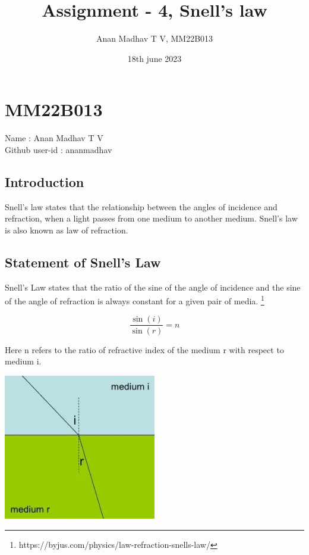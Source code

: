 \documentclass[12pt,a4paper]{article}
\title{Assignment - 4, Snell's law }
\author{Anan Madhav T V, MM22B013}
\date{18th june 2023}
\begin{document}
\maketitle
\section{MM22B013}
Name : Anan Madhav T V\\
Github user-id : ananmadhav 

\subsection{Introduction}
Snell's law states that the relationship between the angles of incidence and refraction, when a light passes from one medium to another medium. Snell's law is also known as law of refraction.

\subsection{Statement of Snell's Law}

Snell's Law states that the ratio of the sine of the angle of incidence and the sine of the angle of refraction is always constant for a given pair of media.
\footnote{https://byjus.com/physics/law-refraction-snells-law/}

\begin{equation}
\frac{{\sin(i)}}{{\sin(r)}} = n 
\end{equation}

Here n refers to the ratio of refractive index of the medium r with respect to medium i.

\begin{center}
    \includegraphics[width=0.5\textwidth]{snells law.jpg}    
\end{center}
\end{document}
